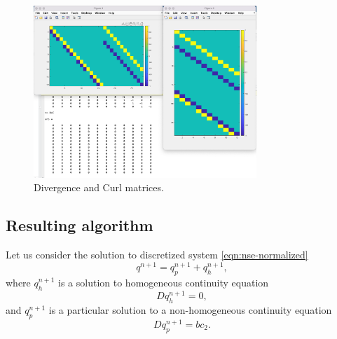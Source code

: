 \documentclass{article}
\begin{document}
\begin{figure}
\begin{center}
  \includegraphics[width=0.75\textwidth]{Figures/D-C-DC}
\end{center}
\caption{Divergence and Curl matrices.}
\label{fig:DC}
\end{figure}


\subsection{Resulting algorithm}\label{sec:algorithm}

Let us consider the solution to discretized system \eqref{eqn:nse-normalized}
\begin{equation}
	q^{n+1}=q^{n+1}_p+q^{n+1}_h,
\end{equation}
where $q^{n+1}_h$ is a solution to homogeneous continuity equation 
\begin{equation}\label{eqn:discrete-homogeneous-continuity}
	Dq^{n+1}_h=0,
\end{equation}
and $q^{n+1}_p$ is a particular solution to a non-homogeneous continuity equation
\begin{equation}\label{eqn:discrete-non-homogeneous-continuity}
	Dq^{n+1}_p=bc_2.
\end{equation}

\end{document}

